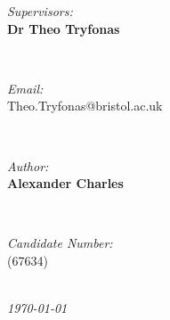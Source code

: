 \documentclass[fontsize=9.5pt]{extarticle}
\makeatletter
\newcommand{\StudentNameA}{Alexander Charles}
\newcommand{\StudentNumberA}{67634}
\newcommand{\SupervisorNameA}{Dr Theo Tryfonas}
\newcommand{\SupervisorEmailA}{Theo.Tryfonas@bristol.ac.uk}
\makeatother
\begin{document}
\begin{titlepage}
\begin{minipage}{0.4\textwidth}
\begin{flushleft} \large
\emph{Supervisors:}\\
\textbf{\SupervisorNameA}\\
\end{flushleft}
\end{minipage}
~
\begin{minipage}{0.4\textwidth}
\begin{flushright} \large
\emph{Email:} \\
\SupervisorEmailA\\

\end{flushright}
\end{minipage}\\[1cm]

\begin{minipage}{0.4\textwidth}
\begin{flushleft} \large
\emph{Author:}\\
	\textbf{\StudentNameA}
\end{flushleft}
\end{minipage}
~
\begin{minipage}{0.4\textwidth}
\begin{flushright} \large
\emph{Candidate Number:} \\
(\StudentNumberA)\\
\end{flushright}
\end{minipage}\\[2cm]

\textit{{\large \today}}\\[1cm] %
\vfill %
\end{titlepage}
\end{document}
